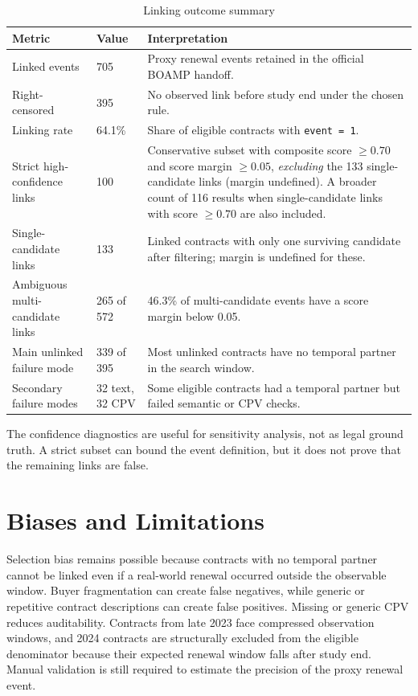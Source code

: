\documentclass[11pt,a4paper]{article}
\begin{document}
\begin{table}[H]
\centering
\caption{Linking outcome summary}
\small
\begin{tabularx}{\linewidth}{L{4.7cm}L{2cm}Y}
\toprule
Metric & Value & Interpretation \\
\midrule
Linked events & 705 & Proxy renewal events retained in the official BOAMP handoff. \\
Right-censored & 395 & No observed link before study end under the chosen rule. \\
Linking rate & 64.1\% & Share of eligible contracts with \texttt{event = 1}. \\
Strict high-confidence links & 100 & Conservative subset with composite score $\geq 0.70$ and score margin $\geq 0.05$, \emph{excluding} the 133 single-candidate links (margin undefined). A broader count of 116 results when single-candidate links with score $\geq 0.70$ are also included. \\
Single-candidate links & 133 & Linked contracts with only one surviving candidate after filtering; margin is undefined for these. \\
Ambiguous multi-candidate links & 265 of 572 & 46.3\% of multi-candidate events have a score margin below 0.05. \\
Main unlinked failure mode & 339 of 395 & Most unlinked contracts have no temporal partner in the search window. \\
Secondary failure modes & 32 text, 32 CPV & Some eligible contracts had a temporal partner but failed semantic or CPV checks. \\
\bottomrule
\end{tabularx}
\end{table}

The confidence diagnostics are useful for sensitivity analysis, not as legal
ground truth. A strict subset can bound the event definition, but it does not
prove that the remaining links are false.

\section{Biases and Limitations}

Selection bias remains possible because contracts with no temporal partner cannot
be linked even if a real-world renewal occurred outside the observable window.
Buyer fragmentation can create false negatives, while generic or repetitive
contract descriptions can create false positives. Missing or generic CPV reduces
auditability. Contracts from late 2023 face compressed observation windows, and
2024 contracts are structurally excluded from the eligible denominator because
their expected renewal window falls after study end. Manual validation is still
required to estimate the precision of the proxy renewal event.
\end{document}

